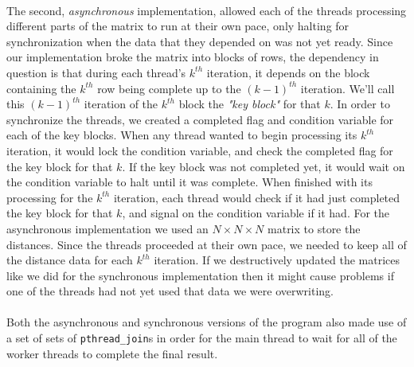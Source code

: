 \documentclass[12pt]{article}
\begin{document}
	\paragraph{}
	\begin{center}
	\def\svgwidth{0.7\textwidth}	
		
	\end{center}
	
	\paragraph{}
	The second, \textit{asynchronous} implementation, allowed each of the threads processing different parts of the matrix to run at their own pace, only halting for synchronization when the data that they depended on was not yet ready. Since our implementation broke the matrix into blocks of rows, the dependency in question is that during each thread's $k^{th}$ iteration, it depends on the block containing the $k^{th}$ row being complete up to the $(k-1)^{th}$ iteration. We'll call this $(k-1)^{th}$ iteration of the $k^{th}$ block the \textit{"key block"} for that $k$. In order to synchronize the threads, we created a completed flag and condition variable for each of the key blocks. When any thread wanted to begin processing its $k^{th}$ iteration, it would lock the condition variable, and check the completed flag for the key block for that $k$. If the key block was not completed yet, it would wait on the condition variable to halt until it was complete. When finished with its processing for the $k^{th}$ iteration, each thread would check if it had just completed the key block for that $k$, and signal on the condition variable if it had. For the asynchronous implementation we used an $N\times N\times N$ matrix to store the distances. Since the threads proceeded at their own pace, we needed to keep all of the distance data for each $k^{th}$ iteration. If we destructively updated the matrices like we did for the synchronous implementation then it might cause problems if one of the threads had not yet used that data we were overwriting.
	
	\paragraph{}
	\def\svgwidth{1\textwidth}	
		
	
	\paragraph{}
	Both the asynchronous and synchronous versions of the program also made use of a set of sets of \texttt{pthread\_join}s in order for the main thread to wait for all of the worker threads to complete the final result.
	
\end{document}
